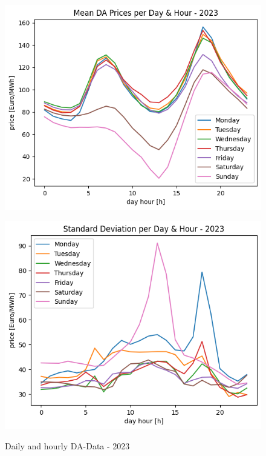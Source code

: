 \begin{figure}[h!]
	\centering
	\begin{minipage}{0.49\textwidth}
		\includegraphics[width=1\linewidth]{pictures/DA/Mean DA Prices per Day and Hour - 2023.png}
		\label{fig:meanDA2023}
	\end{minipage} \hfill
	\begin{minipage}{0.49\textwidth}
		\includegraphics[width=1\linewidth]{pictures/DA/Standard Deviation per Day and Hour - 2023.png}
		\label{fig:stdDA2023}
	\end{minipage}
	\caption{Daily and hourly DA-Data - 2023 }
\end{figure}

